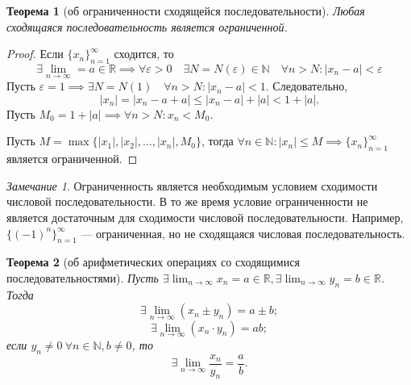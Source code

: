 \documentclass[a4paper,12pt]{article} %
\newtheorem{theorem}{Теорема}[section]
\theoremstyle{remark}
\newtheorem{remark}{Замечание}[theorem]
\theoremstyle{definition}
\begin{document}
\begin{theorem}[об ограниченности сходящейся последовательности]
	Любая сходящаяся последовательность является ограниченной.	
	\begin{center}
	\end{center}
\end{theorem}
\begin{proof}
	Если $\{x_n\}_{n=1}^{\infty}$ сходится, то 
	\[
	\exists \lim_{n \to \infty} = a\in \mathbb{R} \implies \forall \varepsilon>0 \quad \exists N=N(\varepsilon)\in \mathbb{N} \quad \forall n>N : |x_{n}-a|<\varepsilon
	\]
	Пусть $\varepsilon = 1 \implies \exists N=N(1) \quad \forall n>N : |x_{n}-a| < 1$. Следовательно,
	\[
	|x_{n}| = |x_{n}-a+a| \le |x_{n}-a|+|a| < 1+|a|
	.\] 
	Пусть $M_0=1+|a| \implies \forall n>N : x_{n} < M_0$. 
	
	\noindent Пусть $M=\max\{|x_1|, |x_2|, \ldots, |x_{n}|, M_0\}$,
    тогда $\forall n\in \mathbb{N} : |x_{n}|\le M\implies \{x_n\}_{n=1}^{\infty}$ является ограниченной.
\end{proof}

\begin{remark}
	Ограниченность является необходимым условием сходимости числовой последовательности. В то же время условие ограниченности не является достаточным для сходимости числовой последовательности.
	Например, $\{(-1)^n\}_{n=1}^{\infty}$ --- ограниченная, но не сходящаяся числовая последовательность.
\end{remark}

\begin{theorem}[об арифметических операциях со сходящимися последовательностями]
	Пусть $\displaystyle \exists \lim_{n \to \infty} x_n = a \in \mathbb{R}, 
    \exists \lim_{n \to \infty} y_n = b \in \mathbb{R}$. Тогда 
	\[
	\exists \lim_{n \to \infty} (x_n \pm y_n) = a \pm b;
	\]  
	\[
	\exists \lim_{n \to \infty} (x_n \cdot y_n) = ab;
	\] 
	если $y_n\neq 0 \ \forall n\in \mathbb{N}, b\neq 0$, то 
	\[
		\exists \lim_{n \to \infty} \frac{x_{n}}{y_n}=\frac{a}{b}
	.\] 
\end{theorem}
\end{document}

